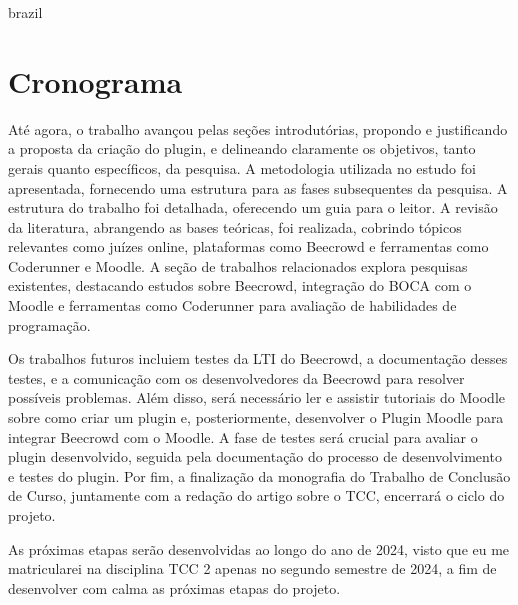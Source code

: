 

\begin{otherlanguage*}{brazil}

    \chapter{Cronograma}
    
    Até agora, o trabalho avançou pelas seções introdutórias, propondo e justificando a proposta da criação do plugin, e delineando claramente os objetivos, tanto gerais quanto específicos, da pesquisa. A metodologia utilizada no estudo foi apresentada, fornecendo uma estrutura para as fases subsequentes da pesquisa. A estrutura do trabalho foi detalhada, oferecendo um guia para o leitor. A revisão da literatura, abrangendo as bases teóricas, foi realizada, cobrindo tópicos relevantes como juízes online, plataformas como Beecrowd e ferramentas como Coderunner e Moodle. A seção de trabalhos relacionados explora pesquisas existentes, destacando estudos sobre Beecrowd, integração do BOCA com o Moodle e ferramentas como Coderunner para avaliação de habilidades de programação.

    Os trabalhos futuros incluiem testes da LTI do Beecrowd, a documentação desses testes, e a comunicação com os desenvolvedores da Beecrowd para resolver possíveis problemas. Além disso, será necessário ler e assistir tutoriais do Moodle sobre como criar um plugin e, posteriormente, desenvolver o Plugin Moodle para integrar Beecrowd com o Moodle. A fase de testes será crucial para avaliar o plugin desenvolvido, seguida pela documentação do processo de desenvolvimento e testes do plugin. Por fim, a finalização da monografia do Trabalho de Conclusão de Curso, juntamente com a redação do artigo sobre o TCC, encerrará o ciclo do projeto.

    As próximas etapas serão desenvolvidas ao longo do ano de 2024, visto que eu me matricularei na disciplina TCC 2 apenas no segundo semestre de 2024, a fim de desenvolver com calma as próximas etapas do projeto.


\end{otherlanguage*}
